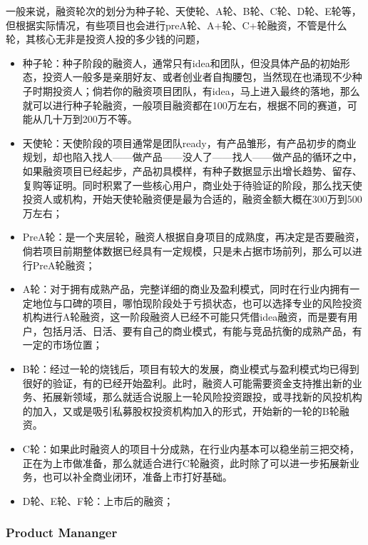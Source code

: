 \documentclass[letterpaper,11pt,english]{sphinxmanual}
\begin{document}
一般来说，融资轮次的划分为种子轮、天使轮、A轮、B轮、C轮、D轮、E轮等，但根据实际情况，有些项目也会进行preA轮、A+轮、C+轮融资，不管是什么轮，其核心无非是投资人投的多少钱的问题，
\begin{itemize}
\item {} 
种子轮：种子阶段的融资人，通常只有idea和团队，但没具体产品的初始形态，投资人一般多是亲朋好友、或者创业者自掏腰包，当然现在也涌现不少种子时期投资人；倘若你的融资项目团队，有idea，马上进入最终的落地，那么就可以进行种子轮融资，一般项目融资都在100万左右，根据不同的赛道，可能从几十万到200万不等。

\item {} 
天使轮：天使阶段的项目通常是团队ready，有产品雏形，有产品初步的商业规划，却也陷入找人——做产品——没人了——找人——做产品的循环之中，如果融资项目已经起步，产品初具模样，有种子数据显示出增长趋势、留存、复购等证明。同时积累了一些核心用户，商业处于待验证的阶段，那么找天使投资人或机构，开始天使轮融资便是最为合适的，融资金额大概在300万到500万左右；

\item {} 
PreA轮：是一个夹层轮，融资人根据自身项目的成熟度，再决定是否要融资，倘若项目前期整体数据已经具有一定规模，只是未占据市场前列，那么可以进行PreA轮融资；

\item {} 
A轮：对于拥有成熟产品，完整详细的商业及盈利模式，同时在行业内拥有一定地位与口碑的项目，哪怕现阶段处于亏损状态，也可以选择专业的风险投资机构进行A轮融资，这一阶段融资人已经不可能只凭借idea融资，而是要有用户，包括月活、日活、要有自己的商业模式，有能与竞品抗衡的成熟产品，有一定的市场位置；

\item {} 
B轮：经过一轮的烧钱后，项目有较大的发展，商业模式与盈利模式均已得到很好的验证，有的已经开始盈利。此时，融资人可能需要资金支持推出新的业务、拓展新领域，那么就适合说服上一轮风险投资跟投，或寻找新的风投机构的加入，又或是吸引私募股权投资机构加入的形式，开始新的一轮的B轮融资。

\item {} 
C轮：如果此时融资人的项目十分成熟，在行业内基本可以稳坐前三把交椅，正在为上市做准备，那么就适合进行C轮融资，此时除了可以进一步拓展新业务，也可以补全商业闭环，准备上市打好基础。

\item {} 
D轮、E轮、F轮：上市后的融资；

\end{itemize}


\subsubsection{Product Mananger}
\label{\detokenize{chapter_introduction/PM:product-mananger}}\label{\detokenize{chapter_introduction/PM::doc}}
\end{document}

